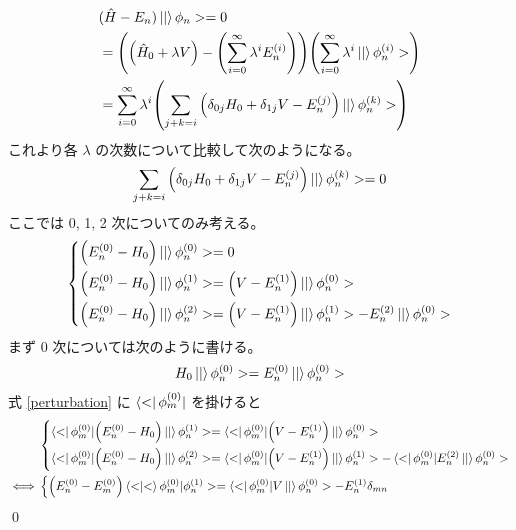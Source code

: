 \documentclass[uplatex,dvipdfmx,a4paper,11pt]{jlreq}
\makeatletter
\numberwithin{equation}{section}
\theoremstyle{definition}
\renewenvironment{proof}[1][\proofname]{\par
  \normalfont
  \topsep6\p@\@plus6\p@ \trivlist
  \item[\hskip\labelsep{\bfseries #1}\@addpunct{\bfseries}]\ignorespaces\quad\par
}{%
  \qed\endtrivlist\@endpefalse
}
\renewcommand\proofname{証明}
\makeatother
\begin{document}
\begin{proof}

  \begin{align}
     & (\hat{H} - E_n)\ket|\phi_n> = 0                                                                                                         \\
     & = \qty(\qty(\hat{H}_0 + \lambda V) - \qty(\sum_{i=0}^{\infty}\lambda^iE_n^{(i)}))\qty(\sum_{i = 0}^{\infty}\lambda^i\ket|\phi_n^{(i)}>) \\
     & = \sum_{i = 0}^{\infty}\lambda^i\qty(\sum_{j+k=i}\qty(\delta_{0j}H_0 + \delta_{1j}V - E_n^{(j)})\ket|\phi_n^{(k)}>)
  \end{align}
  これより各 $\lambda$ の次数について比較して次のようになる。
  \begin{align}
    \sum_{j+k=i}\qty(\delta_{0j}H_0 + \delta_{1j}V - E_n^{(j)})\ket|\phi_n^{(k)}> = 0
  \end{align}
  ここでは 0, 1, 2 次についてのみ考える。
  \begin{align}
    \begin{dcases}
      \qty(E_n^{(0)} - H_0)\ket|\phi_n^{(0)}> = 0                                     \\
      \qty(E_n^{(0)} - H_0)\ket|\phi_n^{(1)}> = \qty(V - E_n^{(1)})\ket|\phi_n^{(0)}> \\
      \qty(E_n^{(0)} - H_0)\ket|\phi_n^{(2)}> = \qty(V - E_n^{(1)})\ket|\phi_n^{(1)}> - E_n^{(2)}\ket|\phi_n^{(0)}>
    \end{dcases}\label{perturbation}
  \end{align}
  まず 0 次については次のように書ける。
  \begin{align}
    H_0\ket|\phi_n^{(0)}> = E_n^{(0)}\ket|\phi_n^{(0)}>
  \end{align}
  式 \eqref{perturbation} に $\bra<\phi_m^{(0)}|$ を掛けると
  \begin{align}
         & \begin{dcases}
             \bra<\phi_m^{(0)}|\qty(E_n^{(0)} - H_0)\ket|\phi_n^{(1)}> = \bra<\phi_m^{(0)}|\qty(V - E_n^{(1)})\ket|\phi_n^{(0)}> \\
             \bra<\phi_m^{(0)}|\qty(E_n^{(0)} - H_0)\ket|\phi_n^{(2)}> = \bra<\phi_m^{(0)}|\qty(V - E_n^{(1)})\ket|\phi_n^{(1)}> - \bra<\phi_m^{(0)}|E_n^{(2)}\ket|\phi_n^{(0)}>
           \end{dcases}        \\
    \iff & \begin{dcases}
             \qty(E_n^{(0)} - E_m^{(0)})\braket<\phi_m^{(0)}|\phi_n^{(1)}> = \bra<\phi_m^{(0)}|V\ket|\phi_n^{(0)}> - E_n^{(1)}\delta_{mn} \\

\end{dcases}
\end{align}
\end{proof}
\end{document}

